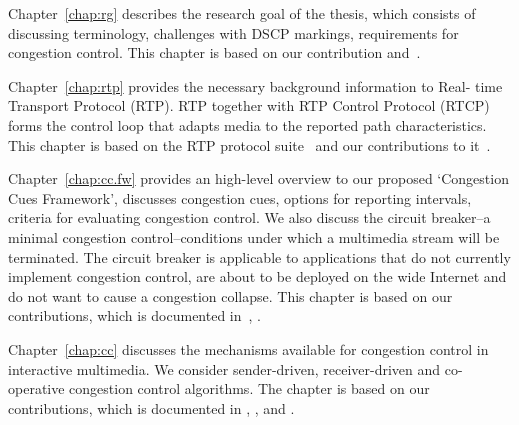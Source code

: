 Chapter~\ref{chap:rg} describes the research goal of the thesis, which
consists of discussing terminology, challenges with DSCP markings,
requirements for congestion control. This chapter is based on our contribution
\cite{Singh:control.loops.api} and~\cite{draft.rmcat.evaluate}.


Chapter~\ref{chap:rtp} provides the necessary background information to Real-
time Transport Protocol (RTP). RTP together with RTP Control Protocol (RTCP)
forms the control loop that adapts media to the reported path characteristics.
This chapter is based on the RTP protocol suite~\cite{rfc3550, rfc4585,
rfc3611, rfc5104, rfc5506} and our contributions to
it~\cite{rfc7097, rfc7005, draft.xr.bytes.discarded}.


Chapter~\ref{chap:cc.fw} provides an high-level overview to our proposed
`Congestion Cues Framework', discusses congestion cues, options for reporting
intervals, criteria for evaluating congestion control. We also discuss the
circuit breaker--a minimal congestion control--conditions under which a
multimedia stream will be terminated. The circuit breaker is applicable to
applications that do not currently implement congestion control, are about to
be deployed on the wide Internet and do not want to cause a congestion
collapse. This chapter is based on our contributions, which is documented
in~\cite{draft.rmcat.evaluate, Singh:PhDFw, draft.rtp.cb}, .



Chapter~\ref{chap:cc} discusses the mechanisms available for congestion
control in interactive multimedia. We consider sender-driven, receiver-driven
and co-operative congestion control algorithms. The chapter is based on our
contributions, which is documented in , ,
\cite{singh:2010.thesis} and .

